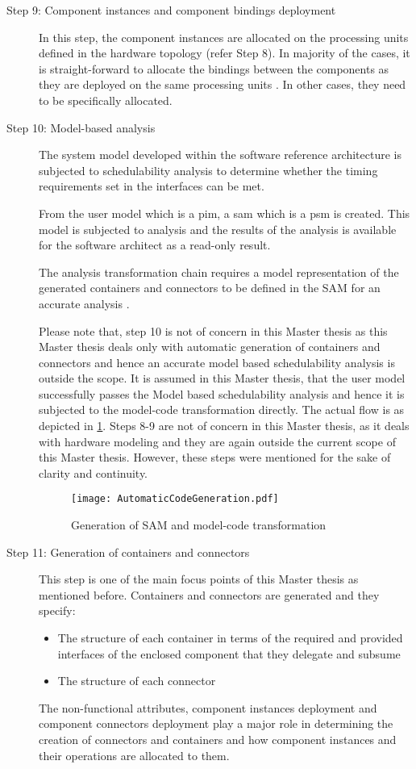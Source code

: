 \begin{description}
\item [Step 9: Component instances and component bindings deployment] In this step, the component instances are allocated on the processing units defined in the hardware topology (refer Step 8). In majority of the cases, it is straight-forward to allocate the bindings between the components as they are deployed on the same processing units \cite{CompBasedProcess}. In other cases, they need to be specifically allocated.

\item [Step 10: Model-based analysis] The system model developed within the software reference architecture is subjected to schedulability analysis to determine whether the timing requirements set in the interfaces can be met.

From the user model which is a \ac{pim}, a \ac{sam} which is a \ac{psm} is created. This model is subjected to analysis and the results of the analysis is available for the software architect as a read-only result. 

The analysis transformation chain requires a model representation of the generated containers and connectors to be defined in the SAM for an accurate analysis \cite{CompBasedProcess}.

Please note that, step 10 is not of concern in this Master thesis as this Master thesis deals only with automatic generation of containers and connectors and hence an accurate model based schedulability analysis is outside the scope. It is assumed in this Master thesis, that the user model successfully passes the Model based schedulability analysis and hence it is subjected to the model-code transformation directly. The actual flow is as depicted in \cref{fig: Automatic code generation}. Steps 8-9 are not of concern in this Master thesis, as it deals with hardware modeling and they are again outside the current scope of this Master thesis. However, these steps were mentioned for the sake of clarity and continuity.

\begin{figure}[h]
	\centering
	\texttt{[image: AutomaticCodeGeneration.pdf]}
	\caption{Generation of SAM and model-code transformation}
	\label{fig: Automatic code generation}
\end{figure}

\item [Step 11: Generation of containers and connectors]  This step is one of the main focus points of this Master thesis as mentioned before. Containers and connectors are generated and they specify:
\begin{itemize}
\item The structure of each container in terms of the required and provided interfaces of the enclosed component that they delegate and subsume
\item The structure of each connector 
\end{itemize} 
The non-functional attributes, component instances deployment and component connectors deployment play a major role in determining the creation of connectors and containers and how component instances and their operations are allocated to them.


\end{description}
